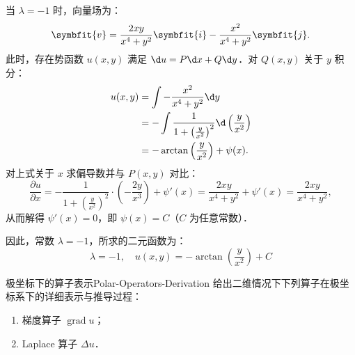 \begin{solution}
    当 $\lambda = -1$ 时，向量场为：
    \begin{equation}
        \symbfit{v} = \frac{2xy}{x^4 + y^2} \symbfit{i} - \frac{x^2}{x^4 + y^2} \symbfit{j}.
    \end{equation}
    此时，存在势函数 $u(x,y)$ 满足 $\d u = P \d x + Q \d y$．对 $Q(x,y)$ 关于 $y$ 积分：
    \begin{equation}
        \begin{aligned}
            u(x,y) & = \int -\frac{x^2}{x^4 + y^2} \d y                                               \\
                   & = -\int \frac{1}{1 + \left(\frac{y}{x^2}\right)^2} \d \left(\frac{y}{x^2}\right) \\
                   & = -\arctan\left(\frac{y}{x^2}\right) + \psi(x).
        \end{aligned}
    \end{equation}
    对上式关于 $x$ 求偏导数并与 $P(x,y)$ 对比：
    \begin{equation}
        \frac{\partial u}{\partial x} = -\frac{1}{1 + \left(\frac{y}{x^2}\right)^2} \cdot \left(-\frac{2y}{x^3}\right) + \psi'(x) = \frac{2xy}{x^4+y^2} + \psi'(x) = \frac{2xy}{x^4+y^2},
    \end{equation}
    从而解得 $\psi'(x) = 0$，即 $\psi(x) = C$（$C$ 为任意常数）．

    因此，常数 $\lambda = -1$，所求的二元函数为：
    \begin{equation}
        \boxed{\lambda = -1, \quad u(x, y) = -\arctan\left(\frac{y}{x^2}\right) + C}
    \end{equation}
\end{solution}

\begin{problem}{极坐标下的算子表示}{Polar-Operators-Derivation}
    给出二维情况下下列算子在极坐标系下的详细表示与推导过程：
    \begin{enumerate}
        \item 梯度算子 $\operatorname{grad} u$；
        \item Laplace 算子 $\Delta u$．
    \end{enumerate}
\end{problem}

